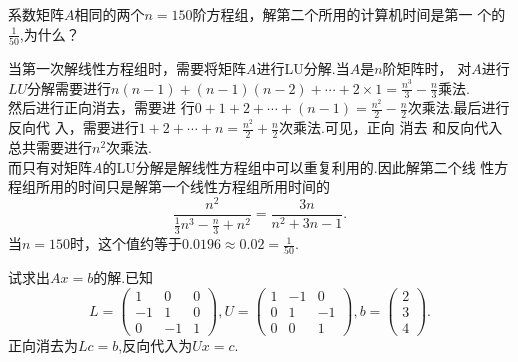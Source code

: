 ﻿\documentclass{book} \usepackage{exsheets} \usepackage{xeCJK}
\begin{document}
\begin{question}
  系数矩阵$A$相同的两个$n=150$阶方程组，解第二个所用的计算机时间是第一
  个的$\frac{1}{50}$,为什么？
\end{question}
\begin{solution}
  当第一次解线性方程组时，需要将矩阵$A$进行LU分解.当$A$是$n$阶矩阵时，
  对$A$进行$LU$分解需要进行$n(n-1)+(n-1)(n-2)+\cdots+2\times
  1=\frac{n^3}{3}-\frac{n}{3}$乘法.\\

  然后进行正向消去，需要进
  行$0+1+2+\cdots+(n-1)=\frac{n^2}{2}-\frac{n}{2}$次乘法.最后进行反向代
  入，需要进行$1+2+\cdots+n=\frac{n^2}{2}+\frac{n}{2}$次乘法.可见，正向
  消去
  和反向代入总共需要进行$n^2$次乘法.\\

  而只有对矩阵$A$的LU分解是解线性方程组中可以重复利用的.因此解第二个线
  性方程组所用的时间只是解第一个线性方程组所用时间的
$$
\frac{n^2}{\frac{1}{3}n^3-\frac{n}{3}+n^2}=\frac{3n}{n^2+3n-1}.
$$
当$n=150$时，这个值约等于$0.0196\approx 0.02=\frac{1}{50}$.
\end{solution}
\begin{question}
  试求出$Ax=b$的解.已知
$$
L=
\begin{pmatrix}
  1&0&0\\
  -1&1&0\\
  0&-1&1
\end{pmatrix},U=
\begin{pmatrix}
  1&-1&0\\
  0&1&-1\\
  0&0&1
\end{pmatrix},b=
\begin{pmatrix}
  2\\
  3\\
  4
\end{pmatrix}.
$$
正向消去为$Lc=b$,反向代入为$Ux=c$.
\end{question}
\end{document}
